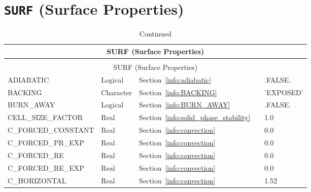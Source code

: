 \documentclass[11pt]{book}
\begin{document}
\vspace{\baselineskip}


\section{\texorpdfstring{{\tt SURF}}{SURF} (Surface Properties)}

\begin{longtable}{@{\extracolsep{\fill}}|l|l|l|l|l|}
\caption[Surface properties ({\ct SURF} namelist group)]{For more information see Section~\ref{info:SURF}.}
\label{tbl:SURF} \\
\hline
\multicolumn{5}{|c|}{{\ct SURF} (Surface Properties)} \\
\hline \hline
\endfirsthead
\caption[]{Continued} \\
\hline
\multicolumn{5}{|c|}{{\ct SURF} (Surface Properties)} \\
\hline \hline
\endhead
{\ct ADIABATIC}                         & Logical         & Section~\ref{info:adiabatic}              &                     & {\ct .FALSE.}           \\ \hline
{\ct BACKING}                           & Character       & Section~\ref{info:BACKING}                &                     & {\ct 'EXPOSED'}         \\ \hline
{\ct BURN\_AWAY}                        & Logical         & Section~\ref{info:BURN_AWAY}              &                     & {\ct .FALSE.}           \\ \hline
{\ct CELL\_SIZE\_FACTOR}                & Real            & Section~\ref{info:solid_phase_stability}  &                     & 1.0                     \\ \hline
{\ct C\_FORCED\_CONSTANT}               & Real            & Section~\ref{info:convection}             &                     & 0.0                     \\ \hline
{\ct C\_FORCED\_PR\_EXP}                & Real            & Section~\ref{info:convection}             &                     & 0.0                     \\ \hline
{\ct C\_FORCED\_RE}                     & Real            & Section~\ref{info:convection}             &                     & 0.0                     \\ \hline
{\ct C\_FORCED\_RE\_EXP}                & Real            & Section~\ref{info:convection}             &                     & 0.0                     \\ \hline
{\ct C\_HORIZONTAL}                     & Real            & Section~\ref{info:convection}             &                     & 1.52                    \\ \hline

\end{longtable}
\end{document}
